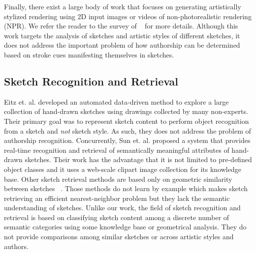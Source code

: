 Finally, there exist a large body of work that focuses on generating artistically stylized rendering using 2D input images or videos of non-photorealistic rendering (NPR). We refer the reader to the survey of ~\cite{Kyprianidis:2013:TAS} for more details. Although this work targets the analysis of sketches and artistic styles of different sketches, it does not address the important problem of how authorship can be determined based on stroke cues manifesting themselves in sketches. %

\vspace{-2mm}
\subsection{Sketch Recognition and Retrieval}
\vspace{-2mm}
Eitz et. al.  developed an automated data-driven method to explore a large collection of hand-drawn sketches using drawings collected by many non-experts. Their primary goal was to represent sketch content to perform object recognition from a sketch and \emph{not} sketch style. As such, they does not address the problem of authorship recognition. Concurrently, Sun et. al. \cite{Sun:2012:SAH:2393347.2396429} proposed a system that provides real-time recognition and retrieval of semantically meaningful attributes of hand-drawn sketches. Their work has the advantage that it is not limited to pre-defined object classes and it uses a web-scale clipart image collection for its knowledge base. Other sketch retrieval methods are based only on geometric similarity between sketches ~\cite{Chalechale05sketch-basedimage,Shrivastava:2011:DVS:2024156.2024188,5674030}. Those methods do not learn by example which makes sketch retrieving an efficient nearest-neighbor problem but they lack the semantic understanding of sketches. Unlike our work, the field of sketch recognition and retrieval is based on classifying sketch content among a discrete number of semantic categories using some knowledge base or geometrical analysis. They do not provide comparisons among similar sketches or across artistic styles and authors. 

\vspace{-2mm}
